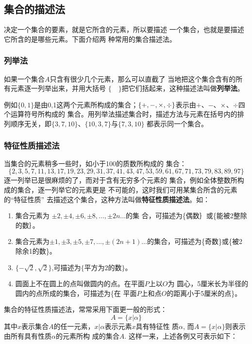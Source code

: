 \subsection{集合的描述法}
决定一个集合的要素，就是它所含的元素，所以要描述
一个集合，也就是要描述它所含的是哪些元素。下面介绍两
种常用的集合描述法。

\subsubsection{列举法}
如果一个集合$A$只含有很少几个元素，那么可以直截了
当地把这个集合含有的所有元素逐一列举出来，并用大括号
$\{\quad \}$把它们括起来，这种描述法叫做\textbf{列举法}。

例如$\{0,1\}$是由0,1这两个元素所构成的集合；$\{+,-,\times,\div\}$表示由$+$、$-$、$\times$、$\div$四个运算符号所构成的
集合。用列举法描述集合时，描述方法与元素在括号内的排
列顺序无关，即$\{3,7,10\}$、$\{10,3,7\}$与$\{7,3,10\}$
都表示同一个集合。

\subsubsection{特征性质描述法}
当集合的元素稍多一些时，如小于100的质数所构成的
集合：$$\{2,3,5,7,11,13,17,19,23,29,31,37,
41,43,47,53,59,61,67,71,73,79,83,89,
97\}$$
逐一列举已是很麻烦的了，而对于含有无穷多个元素的
集合，例如全体整数所构成的集合，逐一列举它的元素更是
不可能的，这时我们可用某集合所含的元素的“特征性质”
去描述这个集合，这种方法叫做\textbf{特征性质描述法}。如：

\begin{enumerate}
\item 集合元素为
$\pm 2,\pm 4,\pm 6,\pm 8,\ldots,\pm 2n\ldots$的集
合，可描述为\{偶数｝或\{能被2整除的数｝。
\item 集合元素为$\pm 1,\pm 3,\pm 5,\pm 7,\ldots,\pm (2n+1)\ldots$的集合，可描述为\{奇数\}或\{被2除余1的数\}。
\item $\{-\sqrt{2},\sqrt{2}\}$,可描述为$\{\text{平方为2的数}\}$。
\item 圆面上不在圆上的点叫做圆内的点。在平面$P$上以$O$为
圆心，5厘米长为半径的圆内的点所成的集合，可描述为\{在
平面$P$上和点$O$的距离小于5厘米的点\}。	
\end{enumerate}

集合的特征性质描述法，常常采用下面更一般的形式：
\[A=\{x|\alpha\}\]
其中$x$表示集合$A$的任一元素，$x|\alpha$表示元素$x$具有特征性
质$\alpha$, 而$A=\{x|\alpha\}$则表示由所有具有性质$\alpha$的元素所构
成的集合$A$. 这样一来，上述各例又可表示如下：























